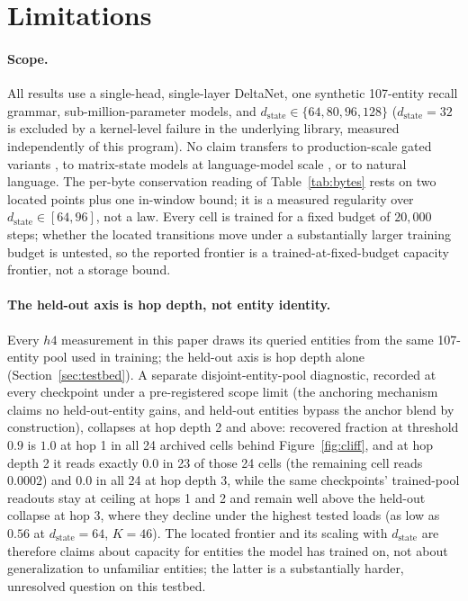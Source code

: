 \section{Limitations}
\label{sec:limitations}

\paragraph{Scope.} All results use a single-head, single-layer DeltaNet,
one synthetic 107-entity recall grammar, sub-million-parameter models, and
$d_{\mathrm{state}} \in \{64, 80, 96, 128\}$
($d_{\mathrm{state}} = 32$ is excluded by a kernel-level failure in the
underlying library, measured independently of this program). No claim
transfers to production-scale gated variants
\citep{siems2025deltaproduct, grazzi2025negative}, to matrix-state models
at language-model scale \citep{mishra2026m2rnn}, or to natural language.
The per-byte conservation reading of Table~\ref{tab:bytes} rests on two
located points plus one in-window bound; it is a measured regularity over
$d_{\mathrm{state}} \in [64, 96]$, not a law. Every cell is trained for a
fixed budget of $20{,}000$ steps; whether the located transitions move
under a substantially larger training budget is untested, so the reported
frontier is a trained-at-fixed-budget capacity frontier, not a storage
bound.

\paragraph{The held-out axis is hop depth, not entity identity.} Every
$h4$ measurement in this paper draws its queried entities from the same
107-entity pool used in training; the held-out axis is hop depth alone
(Section~\ref{sec:testbed}). A separate disjoint-entity-pool diagnostic,
recorded at every checkpoint under a pre-registered scope limit (the
anchoring mechanism claims no held-out-entity gains, and held-out
entities bypass the anchor blend by construction), collapses at hop
depth 2 and above: recovered fraction at threshold $0.9$ is $1.0$ at
hop 1 in all 24 archived cells behind
Figure~\ref{fig:cliff}, and at hop depth 2 it reads exactly $0.0$ in 23
of those 24 cells (the remaining cell reads $0.0002$) and $0.0$ in all
24 at hop depth 3,
while the same checkpoints' trained-pool readouts stay at ceiling at
hops 1 and 2 and remain well above the held-out collapse at hop 3,
where they decline under the highest tested loads (as low as $0.56$
at $d_{\mathrm{state}}=64$, $K{=}46$). %
The located frontier and its scaling with $d_{\mathrm{state}}$ are
therefore claims about capacity for entities the model has trained on,
not about generalization to unfamiliar entities; the latter is a
substantially harder, unresolved question on this testbed.

